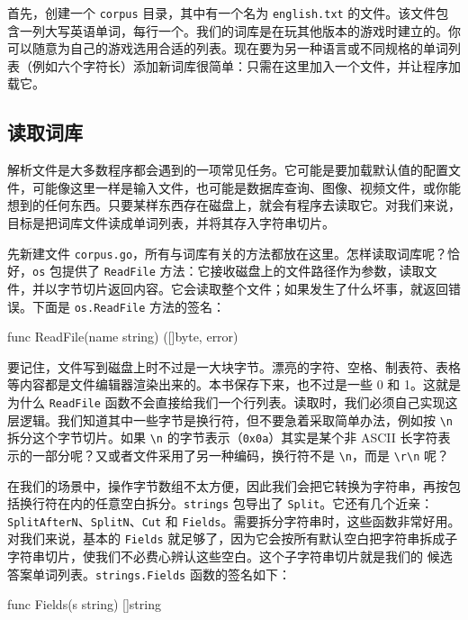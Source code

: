 首先，创建一个 \texttt{corpus} 目录，其中有一个名为 \texttt{english.txt} 的文件。该文件包含一列大写英语单词，每行一个。我们的词库是在玩其他版本的游戏时建立的。你可以随意为自己的游戏选用合适的列表。现在要为另一种语言或不同规格的单词列表（例如六个字符长）添加新词库很简单：只需在这里加入一个文件，并让程序加载它。

\subsection{读取词库}

解析文件是大多数程序都会遇到的一项常见任务。它可能是要加载默认值的配置文件，可能像这里一样是输入文件，也可能是数据库查询、图像、视频文件，或你能想到的任何东西。只要某样东西存在磁盘上，就会有程序去读取它。对我们来说，
目标是把词库文件读成单词列表，并将其存入字符串切片。

先新建文件 \texttt{corpus.go}，所有与词库有关的方法都放在这里。怎样读取词库呢？恰好，\texttt{os} 包提供了 \texttt{ReadFile} 方法：它接收磁盘上的文件路径作为参数，读取文件，并以字节切片返回内容。它会读取整个文件；如果发生了什么坏事，就返回错误。下面是 \texttt{os.ReadFile} 方法的签名：

\begin{gocode}[]
func ReadFile(name string) ([]byte, error)
\end{gocode}

要记住，文件写到磁盘上时不过是一大块字节。漂亮的字符、空格、制表符、表格等内容都是文件编辑器渲染出来的。本书保存下来，也不过是一些 0 和 1。这就是为什么 \texttt{ReadFile} 函数不会直接给我们一个行列表。读取时，我们必须自己实现这层逻辑。我们知道其中一些字节是换行符，但不要急着采取简单办法，例如按 \texttt{\textbackslash n} 拆分这个字节切片。如果 \texttt{\textbackslash n} 的字节表示（\texttt{0x0a}）其实是某个非 ASCII 长字符表示的一部分呢？又或者文件采用了另一种编码，换行符不是 \texttt{\textbackslash n}，而是 \texttt{\textbackslash r\textbackslash n} 呢？

在我们的场景中，操作字节数组不太方便，因此我们会把它转换为字符串，再按包括换行符在内的任意空白拆分。\texttt{strings} 包导出了 \texttt{Split}。它还有几个近亲：\texttt{SplitAfter\allowbreak N}、\texttt{SplitN}、\texttt{Cut} 和 \texttt{Fields}。需要拆分字符串时，这些函数非常好用。对我们来说，基本的 \texttt{Fields} 就足够了，因为它会按所有默认空白把字符串拆成子字符串切片，使我们不必费心辨认这些空白。这个子字符串切片就是我们的
候选答案单词列表。\texttt{strings.Fields} 函数的签名如下：

\begin{gocode}[]
func Fields(s string) []string
\end{gocode}


